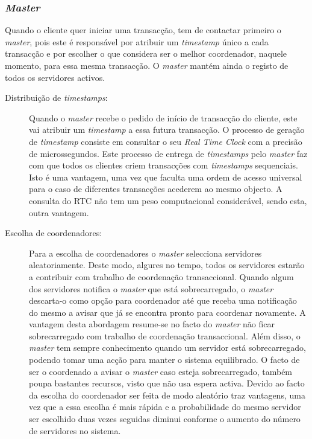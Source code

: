 \subsubsection{\textit{Master}}

Quando o cliente quer iniciar uma transacção, tem de contactar primeiro o \textit{master}, pois este é responsável por atribuir um \textit{timestamp} único a cada transacção e por escolher o que considera ser o melhor coordenador, naquele momento, para essa mesma transacção. O \textit{master} mantém ainda o registo de todos os servidores activos. 

\begin{description}

\item[Distribuição de \textit{timestamps}:]
Quando o \textit{master} recebe o pedido de início de transacção do cliente, este vai atribuir um \textit{timestamp} a essa futura transacção. O processo de geração de \textit{timestamp} consiste em consultar o seu \textit{Real Time Clock} com a precisão de microssegundos.  Este processo de entrega de \textit{timestamps} pelo \textit{master} faz com que todos os clientes criem transacções com \textit{timestamps} sequenciais. Isto é uma vantagem, uma vez que faculta uma ordem de acesso universal para o caso de diferentes transacções acederem ao mesmo objecto. A consulta do RTC não tem um peso computacional considerável, sendo esta, outra vantagem. 

\item[Escolha de coordenadores:]
Para a escolha de coordenadores o \textit{master} selecciona servidores aleatoriamente. Deste modo, algures no tempo, todos os servidores estarão a contribuir com trabalho de coordenação transaccional. Quando algum dos servidores notifica o \textit{master} que está  sobrecarregado, o \textit{master} descarta-o como opção para coordenador até que receba uma notificação do mesmo a avisar que já se encontra pronto para coordenar novamente. A vantagem desta abordagem resume-se no facto do \textit{master} não ficar sobrecarregado com trabalho de coordenação transaccional. Além disso, o \textit{master} tem sempre conhecimento quando um servidor está sobrecarregado, podendo tomar uma acção para manter o sistema equilibrado. O facto de ser o coordenado a avisar o \textit{master} caso esteja sobrecarregado, também poupa bastantes recursos, visto que não usa espera activa. Devido ao facto da escolha do coordenador ser feita de modo aleatório traz vantagens, uma vez que a essa escolha é mais rápida e a probabilidade do mesmo servidor ser escolhido duas vezes seguidas diminui conforme o aumento do número de servidores no sistema.


\end{description}
